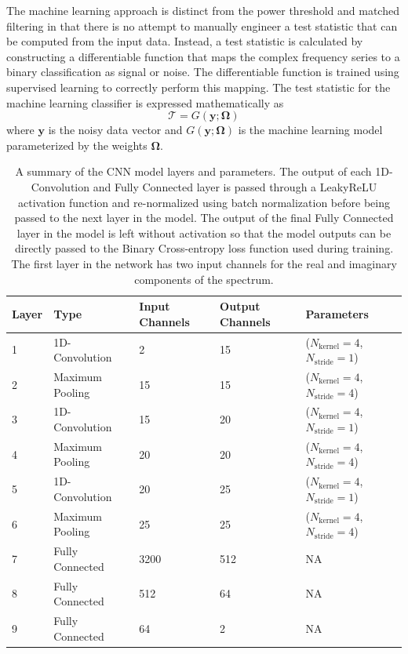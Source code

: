 The machine learning approach is distinct from the power threshold and matched filtering in that there is no attempt to manually engineer a test statistic that can be computed from the input data. Instead, a test statistic is calculated by constructing a differentiable function that maps the complex frequency series to a binary classification as signal or noise. The differentiable function is trained using supervised learning to correctly perform this mapping. The test statistic for the machine learning classifier is expressed mathematically as
\begin{equation}
    \mathcal{T} = G(\mathbf{y};\mathbf{\Omega})
\end{equation}
where $\mathbf{y}$ is the noisy data vector and $G(\mathbf{y}; \mathbf{\Omega})$ is the machine learning model parameterized by the weights $\mathbf{\Omega}$.%

\begin{table}[h]
\centering
\caption{A summary of the CNN model layers and parameters. The output of each 1D-Convolution and Fully Connected layer is passed through a LeakyReLU activation function and re-normalized using batch normalization before being passed to the next layer in the model. The output of the final Fully Connected layer in the model is left without activation so that the model outputs can be directly passed to the Binary Cross-entropy loss function used during training. The first layer in the network has two input channels for the real and imaginary components of the spectrum. \label{tab:cnn_model_params}}
\smallskip
\begin{tabular}{@{}lllll@{}}
\hline
Layer&Type&Input Channels&Output Channels&Parameters\\
\hline
1 & 1D-Convolution & 2 & 15 & ($N_{\textrm{kernel}}=4$, $N_{\textrm{stride}}=1$)\\
2 & Maximum Pooling & 15 & 15 & ($N_{\textrm{kernel}}=4$, $N_{\textrm{stride}}=4$) \\
3 & 1D-Convolution & 15 & 20 & ($N_{\textrm{kernel}}=4$, $N_{\textrm{stride}}=1$)\\
4 & Maximum Pooling & 20 & 20 & ($N_{\textrm{kernel}}=4$, $N_{\textrm{stride}}=4$) \\
5 & 1D-Convolution & 20 & 25 & ($N_{\textrm{kernel}}=4$, $N_{\textrm{stride}}=1$)\\
6 & Maximum Pooling & 25 & 25 & ($N_{\textrm{kernel}}=4$, $N_{\textrm{stride}}=4$) \\
7 & Fully Connected & 3200 & 512 & NA \\
8 & Fully Connected & 512 & 64 & NA \\
9 & Fully Connected & 64 & 2 & NA \\
\hline
\end{tabular}
\end{table}

